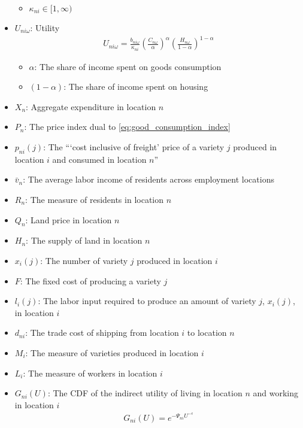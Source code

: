 \begin{itemize}
\begin{itemize}
            \item $\kappa_{n i} \in[1, \infty)$
        \end{itemize}
    \item $U_{n i \omega}$: Utility
        \begin{align}
            U_{n i \omega}=\frac{b_{n i \omega}}{\kappa_{n i}}\left(\frac{C_{n \omega}}{\alpha}\right)^\alpha\left(\frac{H_{n \omega}}{1-\alpha}\right)^{1-\alpha}
        \end{align}
        \begin{itemize}
            \item $\alpha$: The share of income spent on goods consumption
            \item $(1-\alpha)$: The share of income spent on housing
        \end{itemize}
    \item $X_n$: Aggregate expenditure in location $n$
    \item $P_n$: The price index dual to \eqref{eq:good_consumption_index}
    \item $p_{n i}(j)$: The  ```cost inclusive of freight' price of a variety $j$ produced in location $i$ and consumed in location $n$''
    \item $\bar{v}_n$: The average labor income of residents across employment locations
    \item $R_n$: The measure of residents in location $n$
    \item $Q_n$: Land price in location $n$
    \item $H_n$: The supply of land in location $n$
    \item $x_i(j)$: The number of variety $j$ produced in location $i$
    \item $F$: The fixed cost of producing a variety $j$
    \item $l_i(j)$: The labor input required to produce an amount of variety $j$, $x_i(j)$, in location $i$
    \item $d_{ni}$: The trade cost of shipping from location $i$ to location $n$
    \item $M_i$: The measure of varieties produced in location $i$
    \item $L_i$: The measure of workers in location $i$
    \item $G_{ni}(U)$: The CDF of the indirect utility of living in location $n$ and working in location $i$
        \begin{align}
            G_{n i}(U)=e^{-\Psi_{n i} U^{-\epsilon}}
        \end{align}

\end{itemize}
